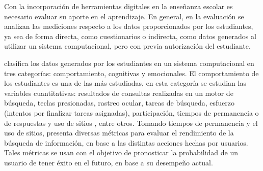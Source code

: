 
Con la incorporación de herramientas digitales en la enseñanza escolar es necesario evaluar su aporte en el aprendizaje. En general, en la evaluación se analizan las mediciones respecto a los datos proporcionados por los estudiantes, ya sea de forma directa, como cuestionarios o indirecta, como datos generados al utilizar un sistema computacional, pero con previa autorización del estudiante.

\textcite{henrie2015measuring} clasifica los datos generados por los estudiantes en un sistema computacional en tres categorías: comportamiento, cognitivas y emocionales. El comportamiento de los estudiantes es una de las más estudiadas, en esta categoría se estudian las variables cuantitativas: resultados de consultas realizadas en un motor de búsqueda, teclas presionadas, rastreo ocular, tareas de búsqueda, esfuerzo (intentos por finalizar tareas asignadas), participación, tiempos de permanencia o de respuestas y uso de sitios , entre otros. Tomando tiempos de permanencia y el uso de sitios, \textcite{Shah2016} presenta diversas métricas para evaluar el rendimiento de la búsqueda de información, en base a las distintas acciones hechas por usuarios. Tales métricas se usan con el objetivo de pronosticar la probabilidad de un usuario de tener éxito en el futuro, en base a su desempeño actual. 

